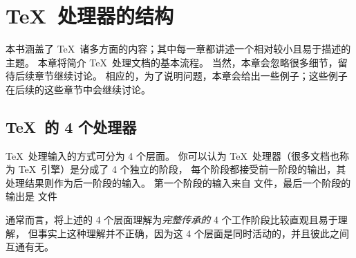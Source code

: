 \documentclass{book}
\begin{document}
\chapter{\TeX\ 处理器的结构}

本书涵盖了 \TeX\ 诸多方面的内容；其中每一章都讲述一个相对较小且易于描述的主题。
本章将简介 \TeX\ 处理文档的基本流程。
当然，本章会忽略很多细节，留待后续章节继续讨论。
相应的，为了说明问题，本章会给出一些例子；这些例子在后续的这些章节中会继续讨论。

\section{\TeX\ 的 4 个处理器}

\TeX\ 处理输入的方式可分为 4 个层面。
你可以认为 \TeX\ 处理器（很多文档也称为 \TeX\ 引擎）是分成了 4 个独立的阶段，
每个阶段都接受前一阶段的输出，其处理结果则作为后一阶段的输入。
第一个阶段的输入来自  文件，最后一个阶段的输出是  文件%

通常而言，将上述的 4 个层面理解为{\em 完整传承的} 4 个工作阶段比较直观且易于理解，
但事实上这种理解并不正确，因为这 4 个层面是同时活动的，并且彼此之间互通有无。
\end{document}
